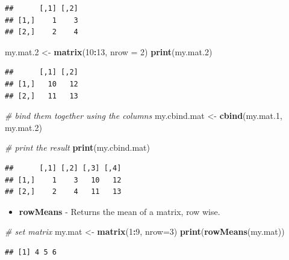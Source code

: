\documentclass[11pt,]{book}
\newenvironment{Shaded}{\begin{snugshade}}{\end{snugshade}}
\newcommand{\KeywordTok}[1]{\textcolor[rgb]{0.27,0.27,0.27}{\textbf{#1}}}
\newcommand{\DataTypeTok}[1]{\textcolor[rgb]{0.27,0.27,0.27}{#1}}
\newcommand{\DecValTok}[1]{\textcolor[rgb]{0.06,0.06,0.06}{#1}}
\newcommand{\StringTok}[1]{\textcolor[rgb]{0.5,0.5,0.5}{#1}}
\newcommand{\CommentTok}[1]{\textcolor[rgb]{0.56,0.35,0.01}{\textit{#1}}}
\newcommand{\OperatorTok}[1]{\textcolor[rgb]{0.81,0.36,0.00}{\textbf{#1}}}
\newcommand{\NormalTok}[1]{#1}
\providecommand{\tightlist}{%
  \setlength{\itemsep}{0pt}\setlength{\parskip}{0pt}}
\begin{document}
\begin{verbatim}
##      [,1] [,2]
## [1,]    1    3
## [2,]    2    4
\end{verbatim}

\begin{Shaded}
\begin{Highlighting}[]
\NormalTok{my.mat.}\DecValTok{2}\NormalTok{ <-}\StringTok{ }\KeywordTok{matrix}\NormalTok{(}\DecValTok{10}\OperatorTok{:}\DecValTok{13}\NormalTok{, }\DataTypeTok{nrow =} \DecValTok{2}\NormalTok{)}
\KeywordTok{print}\NormalTok{(my.mat.}\DecValTok{2}\NormalTok{)}
\end{Highlighting}
\end{Shaded}

\begin{verbatim}
##      [,1] [,2]
## [1,]   10   12
## [2,]   11   13
\end{verbatim}

\begin{Shaded}
\begin{Highlighting}[]
\CommentTok{# bind them together using the columns}
\NormalTok{my.cbind.mat <-}\StringTok{ }\KeywordTok{cbind}\NormalTok{(my.mat.}\DecValTok{1}\NormalTok{, my.mat.}\DecValTok{2}\NormalTok{)}

\CommentTok{# print the result}
\KeywordTok{print}\NormalTok{(my.cbind.mat)}
\end{Highlighting}
\end{Shaded}

\begin{verbatim}
##      [,1] [,2] [,3] [,4]
## [1,]    1    3   10   12
## [2,]    2    4   11   13
\end{verbatim}

\begin{itemize}
\tightlist
\item
  \textbf{rowMeans} - Returns the mean of a matrix, row wise.
\end{itemize}

\begin{Shaded}
\begin{Highlighting}[]
\CommentTok{# set matrix}
\NormalTok{my.mat <-}\StringTok{ }\KeywordTok{matrix}\NormalTok{(}\DecValTok{1}\OperatorTok{:}\DecValTok{9}\NormalTok{, }\DataTypeTok{nrow=}\DecValTok{3}\NormalTok{)}
\KeywordTok{print}\NormalTok{(}\KeywordTok{rowMeans}\NormalTok{(my.mat))}
\end{Highlighting}
\end{Shaded}

\begin{verbatim}
## [1] 4 5 6
\end{verbatim}
\end{document}
